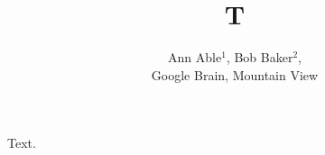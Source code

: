 \documentclass{article}
\begin{document}
\title{T}
\author{Ann Able$^{1}$, Bob Baker$^{2}$,\\ Google Brain, Mountain View}
\maketitle
Text.
\end{document}
